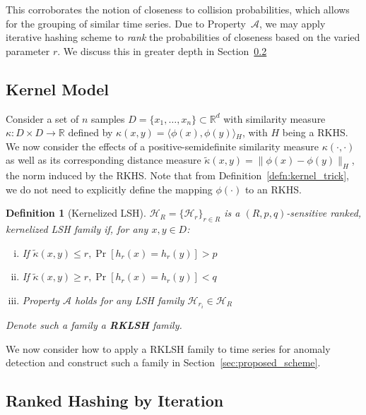 \documentclass[a4paper]{article}
\newcommand{\innerproduct}[2]{\langle{}#1,#2\rangle{}}
\theoremstyle{def}
\newtheorem{definition}{Definition}
\theoremstyle{thm}
\newcommand{\R}[0]{\mathbb{R}}
\newcommand{\LSH}[0]{\mathcal{H}}
\begin{document}

This corroborates the notion of closeness to collision probabilities, which allows for the grouping of similar time series.
Due to Property~$\mathscr{A}$, we may apply iterative hashing scheme to \textit{rank} the probabilities of closeness based on the varied parameter $r$.
We discuss this in greater depth in Section~\ref{subsec:ranked_lsh}

\subsection{Kernel Model}
\label{subsec:kernel_model}

Consider a set of $n$ samples $D = \{x_1,\ldots,x_n\} \subset \R^d$ with similarity measure $\kappa \colon D \times D \rightarrow \R$ defined by $\kappa(x,y) = \innerproduct{\phi(x)}{\phi(y)}_H$, with $H$ being a RKHS.
We now consider the effects of a positive-semidefinite similarity measure $\kappa(\cdot, \cdot)$ as well as its corresponding distance measure $\tilde{\kappa}(x,y) = \|\phi(x) - \phi(y)\|_H$, the norm induced by the RKHS.
Note that from Definition~\ref{defn:kernel_trick}, we do not need to explicitly define the mapping $\phi(\cdot)$ to an RKHS.

\begin{definition}[Kernelized LSH]\label{defn:kernel_lsh}
    ${\LSH}_R = \{ {\LSH}_r \}_{r \in R}$ is a $(R, p, q)$-sensitive ranked, kernelized LSH family if, for any $x,y \in D$:
    \begin{enumerate}[(i)]
        \item If $\tilde{\kappa}(x,y) \le r, \Pr[h_r(x) = h_r(y)] > p$
        \item If $\tilde{\kappa}(x,y) \ge r, \Pr[h_r(x) = h_r(y)] < q$
        \item Property $\mathscr{A}$ holds for any LSH family ${\LSH}_{r_i} \in {\LSH}_R$
    \end{enumerate}
    Denote such a family a \textbf{RKLSH} family.
\end{definition}

We now consider how to apply a RKLSH family to time series for anomaly detection and construct such a family in Section~\ref{sec:proposed_scheme}.

\subsection{Ranked Hashing by Iteration}
\label{subsec:ranked_lsh}
\end{document}
